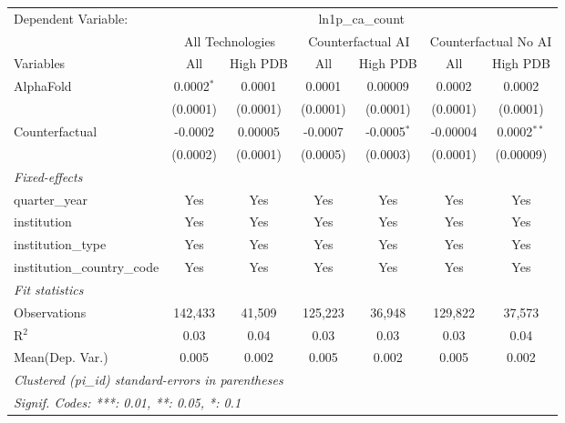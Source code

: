\begingroup
\centering
\begin{tabular}{lcccccc}
   \tabularnewline \midrule \midrule
   Dependent Variable: & \multicolumn{6}{c}{ln1p\_ca\_count}\\
 & \multicolumn{2}{c}{All Technologies} & \multicolumn{2}{c}{Counterfactual AI} & \multicolumn{2}{c}{Counterfactual No AI} \\
\cmidrule(lr){1-1}\cmidrule(lr){2-3} \cmidrule(lr){4-5} \cmidrule(lr){6-7}
Variables & \multicolumn{1}{c}{All} & \multicolumn{1}{c}{High PDB} & \multicolumn{1}{c}{All} & \multicolumn{1}{c}{High PDB} & \multicolumn{1}{c}{All} & \multicolumn{1}{c}{High PDB} \\
\cmidrule(lr){1-1}\cmidrule(lr){2-2} \cmidrule(lr){3-3} \cmidrule(lr){4-4} \cmidrule(lr){5-5} \cmidrule(lr){6-6} \cmidrule(lr){7-7}
   AlphaFold                    & 0.0002$^{*}$ & 0.0001   & 0.0001   & 0.00009       & 0.0002   & 0.0002\\   
                                & (0.0001)     & (0.0001) & (0.0001) & (0.0001)      & (0.0001) & (0.0001)\\   
   Counterfactual               & -0.0002      & 0.00005  & -0.0007  & -0.0005$^{*}$ & -0.00004 & 0.0002$^{**}$\\   
                                & (0.0002)     & (0.0001) & (0.0005) & (0.0003)      & (0.0001) & (0.00009)\\   
   \midrule
   \emph{Fixed-effects}\\
   quarter\_year                & Yes          & Yes      & Yes      & Yes           & Yes      & Yes\\  
   institution                  & Yes          & Yes      & Yes      & Yes           & Yes      & Yes\\  
   institution\_type            & Yes          & Yes      & Yes      & Yes           & Yes      & Yes\\  
   institution\_country\_code   & Yes          & Yes      & Yes      & Yes           & Yes      & Yes\\  
   \midrule
   \emph{Fit statistics}\\
   Observations                 & 142,433      & 41,509   & 125,223  & 36,948        & 129,822  & 37,573\\  
   R$^2$                        & 0.03         & 0.04     & 0.03     & 0.03          & 0.03     & 0.04\\  
Mean(Dep. Var.) & 0.005 & 0.002 & 0.005 & 0.002 & 0.005 & 0.002 \\
   \midrule \midrule
   \multicolumn{7}{l}{\emph{Clustered (pi\_id) standard-errors in parentheses}}\\
   \multicolumn{7}{l}{\emph{Signif. Codes: ***: 0.01, **: 0.05, *: 0.1}}\\
\end{tabular}
\par\endgroup
